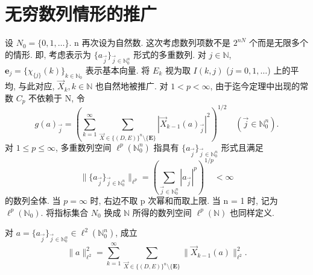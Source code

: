 
\section{无穷数列情形的推广}\label{sec:1.11}




设 $N_{0} = \{0, 1, \ldots\}$. n 再次设为自然数. 这次考虑数列项数不是 $2^{nN}$ 个而是无限多个的情形. 即, 考虑表示为 $\{a_{\vec{j}}\}_{\vec{j}\in\mathbb{N}_{0}^{n}}$ 形式的多重数列. 对 $j \in \mathbb{N}$, $\mathbf{e}_{j} = \{\chi_{\{j\}}(k)\}_{k\in\mathbb{N}_{0}}$ 表示基本向量. 将 $E_{k}$ 视为取 $I(k,j)$ ($j = 0, 1, \ldots$) 上的平均, 与此对应, $\vec{X}_{k}, k \in \mathbb{N}$ 也自然地被推广. 对 $1 < p < \infty$, 由于迄今定理中出现的常数 $C_{p}$ 不依赖于 N, 令
\[
g(a)_{\vec{j}} = \left(\sum_{k=1}^{\infty}\sum_{\vec{X}\in\{(D,E)\}^{n}\setminus\{\mathbf{E}\}}|\vec{X}_{k-1}(a)_{\vec{j}}|^{2}\right)^{1/2} \quad (\vec{j} \in \mathbb{N}_{0}^{n}).
\]
对 $1 \leq p \leq \infty$, 多重数列空间 $\ell^{p}(\mathbb{N}_{0}^{n})$ 指具有 $\{a_{\vec{j}}\}_{\vec{j}\in\mathbb{N}_{0}^{n}}$ 形式且满足
\[
\|\{a_{\vec{j}}\}_{\vec{j}\in\mathbb{N}_{0}^{n}}\|_{\ell^{p}} = \left(\sum_{\vec{j}\in\mathbb{N}_{0}^{n}}|a_{\vec{j}}|^{p}\right)^{1/p} < \infty
\]
的数列全体. 当 $p = \infty$ 时, 右边不取 p 次幂和而取上限. 当 n = 1 时, 记为 $\ell^{p}(\mathbb{N}_{0})$. 将指标集合 $N_{0}$ 换成 $\mathbb{N}$ 所得的数列空间 $\ell^{p}(\mathbb{N})$ 也同样定义.

\begin{lemma}\label{lem:1.5}
对 $a = \{a_{\vec{j}}\}_{\vec{j}\in\mathbb{N}_{0}^{n}} \in \ell^{2}(\mathbb{N}_{0}^{n})$, 成立
\[
\|a\|_{\ell^{2}}^{2} = \sum_{k=1}^{\infty}\sum_{\vec{X}\in\{(D,E)\}^{n}\setminus\{\mathbf{E}\}}\|\vec{X}_{k-1}(a)\|_{\ell^{2}}^{2}.
\]
\end{lemma}

